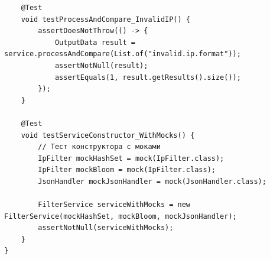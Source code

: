 \begin{verbatim}
    @Test
    void testProcessAndCompare_InvalidIP() {
        assertDoesNotThrow(() -> {
            OutputData result = service.processAndCompare(List.of("invalid.ip.format"));
            assertNotNull(result);
            assertEquals(1, result.getResults().size());
        });
    }

    @Test
    void testServiceConstructor_WithMocks() {
        // Тест конструктора с моками
        IpFilter mockHashSet = mock(IpFilter.class);
        IpFilter mockBloom = mock(IpFilter.class);
        JsonHandler mockJsonHandler = mock(JsonHandler.class);

        FilterService serviceWithMocks = new FilterService(mockHashSet, mockBloom, mockJsonHandler);
        assertNotNull(serviceWithMocks);
    }
}
\end{verbatim}